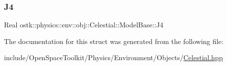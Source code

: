 \subsubsection{\texorpdfstring{J4}{J4}}
{\footnotesize\ttfamily Real ostk\+::physics\+::env\+::obj\+::\+Celestial\+::\+Model\+Base\+::\+J4\hspace{0.3cm}{\ttfamily [static]}}



The documentation for this struct was generated from the following file\+:\begin{DoxyCompactItemize}
\item 
include/\+Open\+Space\+Toolkit/\+Physics/\+Environment/\+Objects/\hyperlink{_celestial_8hpp}{Celestial.\+hpp}\end{DoxyCompactItemize}
